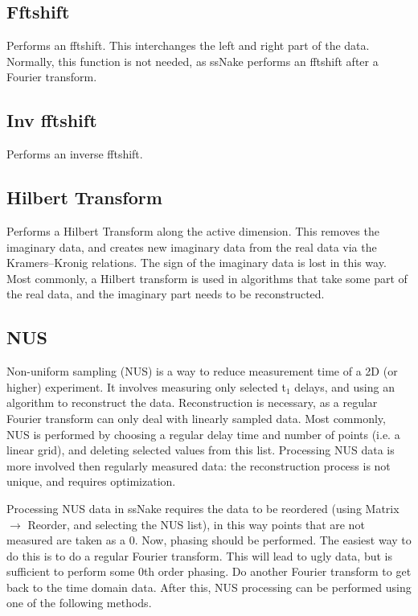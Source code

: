 \documentclass[11pt,a4paper]{article}
\begin{document}
\subsection{Fftshift}
Performs an fftshift. This interchanges the left and right part of the data.
Normally, this function is not needed, as ssNake performs an fftshift after a Fourier transform.

\subsection{Inv fftshift}
Performs an inverse fftshift.


\subsection{Hilbert Transform}
Performs a Hilbert Transform along the active dimension.
This removes the imaginary data, and creates new imaginary data from the real data via the Kramers--Kronig relations.
The sign of the imaginary data is lost in this way.
Most commonly, a Hilbert transform is used in algorithms that take some part of the real data, and the imaginary part needs to be reconstructed.


\subsection{NUS}
Non-uniform sampling (NUS) is a way to reduce measurement time of a 2D (or higher) experiment.
It involves measuring only selected t$_1$ delays, and using an algorithm to reconstruct the data.
Reconstruction is necessary, as a regular Fourier transform can only deal with linearly sampled data.
Most commonly, NUS is performed by choosing a regular delay time and number of points (i.e. a linear grid), and deleting selected values from this list.
Processing NUS data is more involved then regularly measured data: the reconstruction process is not unique, and requires optimization.

Processing NUS data in ssNake requires the data to be reordered (using Matrix $\rightarrow$ Reorder, and selecting the NUS list), in this way points that are not measured are taken as a 0.
Now, phasing should be performed.
The easiest way to do this is to do a regular Fourier transform.
This will lead to ugly data, but is sufficient to perform some 0th order phasing.
Do another Fourier transform to get back to the time domain data.
After this, NUS processing can be performed using one of the following methods.
\end{document}
